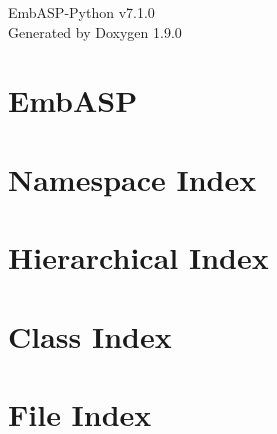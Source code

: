\let\mypdfximage\pdfximage\def\pdfximage{\immediate\mypdfximage}\documentclass[twoside]{book}
\newcommand{\+}{\discretionary{\mbox{\scriptsize$\hookleftarrow$}}{}{}}
\newcommand{\clearemptydoublepage}{%
  \newpage{\pagestyle{empty}\cleardoublepage}%
}
\begin{document}
\raggedbottom

\hypersetup{pageanchor=false,
             bookmarksnumbered=true,
             pdfencoding=unicode
            }
\begin{titlepage}
\vspace*{7cm}
\begin{center}%
{\Large Emb\+ASP-\/\+Python v7.1.0 }\\
\vspace*{1cm}
{\large Generated by Doxygen 1.9.0}\\
\end{center}
\end{titlepage}
\clearemptydoublepage
{}
\tableofcontents
\clearemptydoublepage
{}
\hypersetup{pageanchor=true}

\chapter{Emb\+ASP}
\label{index}\hypertarget{index}{}
\chapter{Namespace Index}

\chapter{Hierarchical Index}

\chapter{Class Index}

\chapter{File Index}

\end{document}
